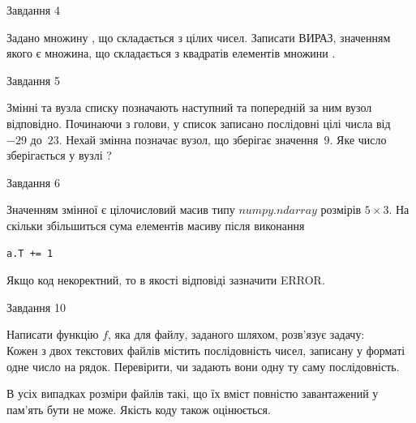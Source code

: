 \documentclass[12pt, ukrainian]{article}
\begin{document}
{               
{\begin{center}Завдання {4}\end{center}}
\vspace{-6mm}
Задано множину , що складається з цілих чисел. Записати ВИРАЗ, значенням якого є множина, що складається  з квадратів елементів множини .\par

\vspace{10mm}
               
{\begin{center}Завдання {5}\end{center}}
\vspace{-6mm}
Змінні  та  вузла списку позначають наступний та попередній за ним вузол відповідно. Починаючи з голови, у список записано послідовні цілі числа від~$-29$ до~$23$. Нехай змінна  позначає вузол, що зберігає значення~$9$.
Яке число зберігається у вузлі  ?\par

               
{\begin{center}Завдання {6}\end{center}}
\vspace{-6mm}
Значенням змінної  є цілочисловий масив типу $numpy.ndarray$ розмірів $5{\times}3$. На скільки збільшиться сума елементів масиву  після виконання
\begin{verbatim}
a.T += 1
\end{verbatim}


Якщо код некоректний, то в якості відповіді зазначити ERROR.\par

               
{\begin{center}Завдання {10}\end{center}}
\vspace{-6mm}

Написати функцію $f$, яка для файлу, заданого шляхом, розв’язує задачу:\\ Кожен з двох текстових файлів містить послідовність чисел, записану у форматі одне число на рядок.  Перевірити, чи задають вони одну ту саму послідовність.

В усіх випадках розміри файлів такі, що їх вміст повністю завантажений у пам'ять бути не може. Якість коду також оцінюється.



\vspace{10mm}\par

}
\end{document}
